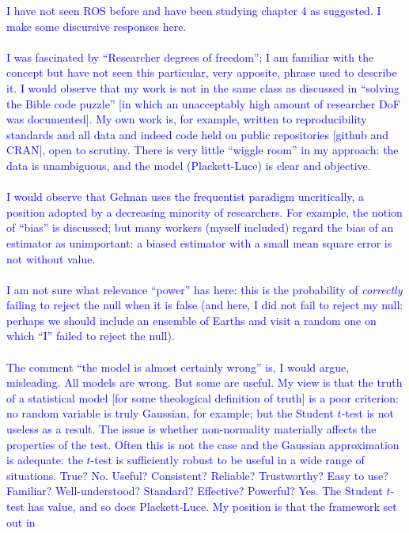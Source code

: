 \documentclass[12pt]{article}
\begin{document}
\textcolor{blue}{I have not seen ROS before and have been studying
  chapter 4 as suggested.  I make some discursive responses
  here.\\ \\ I was fascinated by ``Researcher degrees of freedom''; I
  am familiar with the concept but have not seen this particular, very
  apposite, phrase used to describe it.  I would observe that my work
  is not in the same class as discussed in ``solving the Bible code
  puzzle'' [in which an unacceptably high amount of researcher DoF was
    documented].  My own work is, for example, written to
  reproducibility standards and all data and indeed code held on
  public repositories [github and CRAN], open to scrutiny.  There is
  very little ``wiggle room'' in my approach: the data is unambiguous,
  and the model (Plackett-Luce) is clear and objective.\\ \\ I would
  observe that Gelman uses the frequentist paradigm uncritically, a
  position adopted by a decreasing minority of researchers.  For
  example, the notion of ``bias'' is discussed; but many workers
  (myself included) regard the bias of an estimator as unimportant: a
  biased estimator with a small mean square error is not without
  value.\\ \\I am not sure what relevance ``power'' has here: this is
  the probability of {\em correctly} failing to reject the null when
  it is false (and here, I did not fail to reject my null: perhaps we
  should include an ensemble of Earths and visit a random one on which
  ``I'' failed to reject the null).\\ \\ The comment ``the model is
  almost certainly wrong'' is, I would argue, misleading.  All models
  are wrong.  But some are useful.  My view is that the truth of a
  statistical model [for some theological definition of truth] is a
  poor criterion: no random variable is truly Gaussian, for example;
  but the Student $t$-test is not useless as a result.  The issue is
  whether non-normality materially affects the properties of the test.
  Often this is not the case and the Gaussian approximation is
  adequate: the $t$-test is sufficiently robust to be useful in a wide
  range of situations.  True? No. Useful?  Consistent? Reliable?
  Trustworthy?  Easy to use?  Familiar?  Well-understood? Standard?
  Effective?  Powerful?  Yes.  The Student $t$-test has value, and so
  does Plackett-Luce.  My position is that the framework set out in
}
\end{document}
